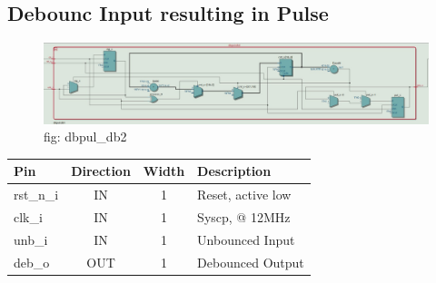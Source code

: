 \documentclass[12pt,a4 paper] {report}
\begin{document}
\subsection{Debounc Input resulting in Pulse}
\begin{figure}[h]
	\centering	
	\includegraphics[scale=0.3]{../png/dbpul_db2.png}
	\newline
	fig: dbpul\_db2\\
\end{figure}
\begin{center}
	\begin{tabular}{ | p{2cm} | c | c | p{5cm} |}
		\hline
		\textbf{Pin} & \textbf{Direction} & \textbf{Width} & \textbf{Description} \\
		\hline	
  	rst\_n\_i & IN & 1 &  Reset, active low \\
  	\hline
		clk\_i & IN & 1 & Syscp, @ 12MHz \\
		\hline
		unb\_i & IN & 1 & Unbounced Input \\
		\hline
		deb\_o & OUT & 1 & Debounced Output \\
		\hline
	\end{tabular}
\end{center}
\newpage
\end{document}
